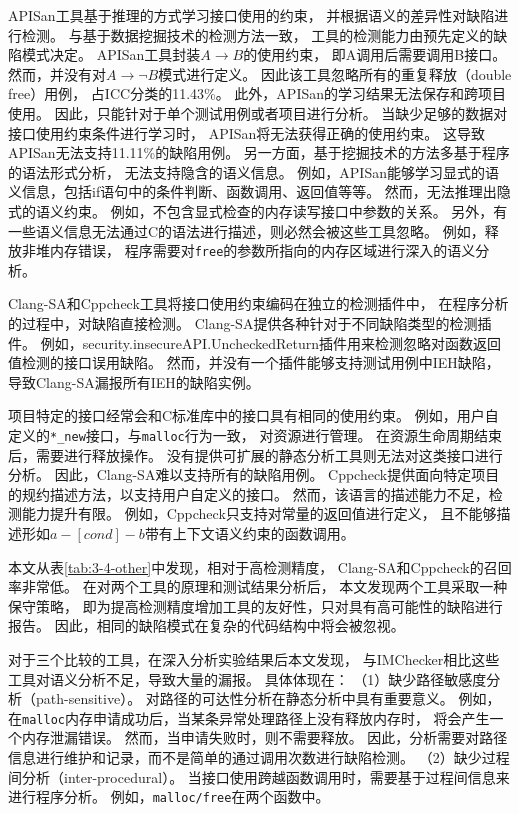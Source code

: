 APISan工具基于推理的方式学习接口使用的约束，
并根据语义的差异性对缺陷进行检测。
与基于数据挖掘技术的检测方法一致，
工具的检测能力由预先定义的缺陷模式决定。
APISan工具封装$A \rightarrow B$的使用约束，
即A调用后需要调用B接口。
然而，并没有对$A \rightarrow \neg B$模式进行定义。
因此该工具忽略所有的重复释放（double free）用例，
占ICC分类的11.43\%。
此外，APISan的学习结果无法保存和跨项目使用。
因此，只能针对于单个测试用例或者项目进行分析。
当缺少足够的数据对接口使用约束条件进行学习时，
APISan将无法获得正确的使用约束。
这导致APISan无法支持11.11\%的缺陷用例。
另一方面，基于挖掘技术的方法多基于程序的语法形式分析，
无法支持隐含的语义信息。
例如，APISan能够学习显式的语义信息，包括if语句中的条件判断、函数调用、返回值等等。
然而，无法推理出隐式的语义约束。
例如，不包含显式检查的内存读写接口中参数的关系。
另外，有一些语义信息无法通过C的语法进行描述，则必然会被这些工具忽略。
例如，释放非堆内存错误，
程序需要对\texttt{free}的参数所指向的内存区域进行深入的语义分析。

Clang-SA和Cppcheck工具将接口使用约束编码在独立的检测插件中，
在程序分析的过程中，对缺陷直接检测。
Clang-SA提供各种针对于不同缺陷类型的检测插件。
例如，security.insecureAPI.UncheckedReturn插件用来检测忽略对函数返回值检测的接口误用缺陷。
然而，并没有一个插件能够支持测试用例中IEH缺陷，
导致Clang-SA漏报所有IEH的缺陷实例。

项目特定的接口经常会和C标准库中的接口具有相同的使用约束。
例如，用户自定义的\texttt{*\_new}接口，与\texttt{malloc}行为一致，
对资源进行管理。
在资源生命周期结束后，需要进行释放操作。
没有提供可扩展的静态分析工具则无法对这类接口进行分析。
因此，Clang-SA难以支持所有的缺陷用例。
Cppcheck提供面向特定项目的规约描述方法，以支持用户自定义的接口。
然而，该语言的描述能力不足，检测能力提升有限。
例如，Cppcheck只支持对常量的返回值进行定义，
且不能够描述形如$a - [cond] - b$带有上下文语义约束的函数调用。

本文从表\ref{tab:3-4-other}中发现，相对于高检测精度，
Clang-SA和Cppcheck的召回率非常低。
在对两个工具的原理和测试结果分析后，
本文发现两个工具采取一种保守策略，
即为提高检测精度增加工具的友好性，只对具有高可能性的缺陷进行报告。
因此，相同的缺陷模式在复杂的代码结构中将会被忽视。

对于三个比较的工具，在深入分析实验结果后本文发现，
与IMChecker相比这些工具对语义分析不足，导致大量的漏报。
具体体现在：
（1）缺少路径敏感度分析（path-sensitive）。
对路径的可达性分析在静态分析中具有重要意义。
例如，在\texttt{malloc}内存申请成功后，当某条异常处理路径上没有释放内存时，
将会产生一个内存泄漏错误。
然而，当申请失败时，则不需要释放。
因此，分析需要对路径信息进行维护和记录，而不是简单的通过调用次数进行缺陷检测。
（2）缺少过程间分析（inter-procedural）。
当接口使用跨越函数调用时，需要基于过程间信息来进行程序分析。
例如，\texttt{malloc/free}在两个函数中。


